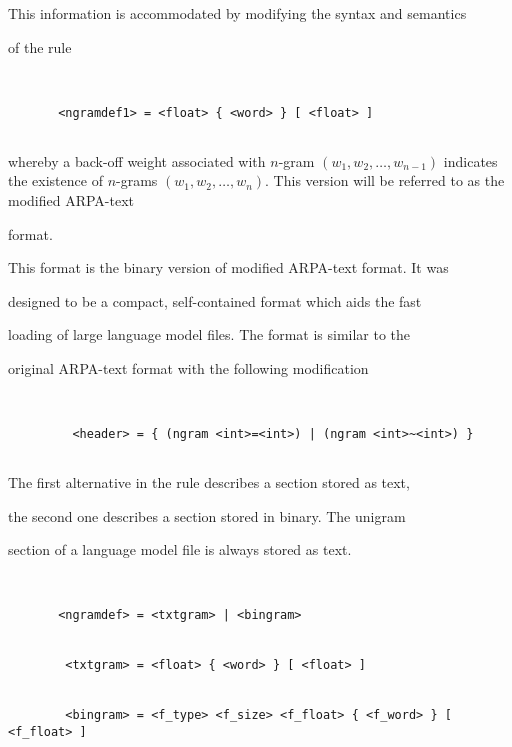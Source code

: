 This information is accommodated by modifying the syntax and semantics


of the rule


\begin{verbatim}


       <ngramdef1> = <float> { <word> } [ <float> ]


\end{verbatim}


whereby a back-off weight associated with $n$-gram $(w_1, w_2,\ldots,


w_{n-1})$ indicates the existence of $n$-grams $(w_1, w_2, \ldots,


w_n)$. This version will be referred to as the modified ARPA-text


format.


  






This format is the binary version of modified ARPA-text format. It was


designed to be a compact, self-contained format which aids the fast


loading of large language model files. The format is similar to the


original ARPA-text format with the following modification


\begin{verbatim}


         <header> = { (ngram <int>=<int>) | (ngram <int>~<int>) } 


\end{verbatim}


The first alternative in the rule describes a section stored as text,


the second one describes a section stored in binary. The unigram


section of a language model file is always stored as text.


\begin{verbatim}


       <ngramdef> = <txtgram> | <bingram>


        <txtgram> = <float> { <word> } [ <float> ]


        <bingram> = <f_type> <f_size> <f_float> { <f_word> } [ <f_float> ]


\end{verbatim}


